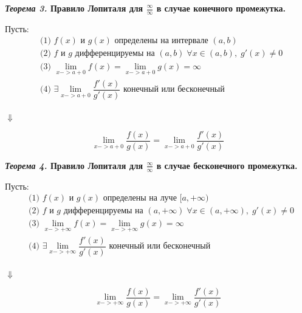 \documentclass[a4paper,12pt]{article}
\theoremstyle{plain} %
\theoremstyle{definition} %
\theoremstyle{remark} %
\begin{document}
\textbf{\textit{Теорема 3.} Правило Лопиталя для $\frac{\infty}{\infty}$ в случае конечного промежутка.}

Пусть:
\begin{equation*}
	\begin{aligned}
		 & \text{(1) } f(x) \text{ и } g(x) \text{ определены на интервале }(a, b)                                 \\
		 & \text{(2) } f \text{ и } g \text{ дифференцируемы на } (a, b)  \; \forall x \in (a, b), \; g'(x) \neq 0 \\
		 & \text{(3) }  \lim_{x-> a + 0} f(x) =  \lim_{x-> a + 0} g(x) = \infty                                    \\
		 & \text{(4) }  \exists \lim_{x-> a + 0 } \dfrac{f'(x)}{g'(x)} \text{ конечный или бесконечный }           \\
	\end{aligned}
\end{equation*}

\begin{center}
	$\Downarrow$
\end{center}

\[\lim_{x-> a + 0} \dfrac{f(x)}{g(x)} =\lim_{x-> a + 0 } \dfrac{f'(x)}{g'(x)} \]



\textbf{\textit{Теорема 4.} Правило Лопиталя для $\frac{\infty}{\infty}$ в случае бесконечного промежутка.}

Пусть:
\begin{equation*}
	\begin{aligned}
		 & \text{(1) } f(x) \text{ и } g(x) \text{ определены на луче }[a, +\infty)                                            \\
		 & \text{(2) } f \text{ и } g \text{ дифференцируемы на } (a, +\infty)  \; \forall x \in (a, +\infty), \; g'(x) \neq 0 \\
		 & \text{(3) }  \lim_{x-> + \infty} f(x) =  \lim_{x-> +\infty} g(x) = \infty                                           \\
		 & \text{(4) }  \exists \lim_{x-> +\infty } \dfrac{f'(x)}{g'(x)} \text{ конечный или бесконечный }                     \\
	\end{aligned}
\end{equation*}

\begin{center}
	$\Downarrow$
\end{center}

\[\lim_{x-> + \infty} \dfrac{f(x)}{g(x)} =\lim_{x-> + \infty } \dfrac{f'(x)}{g'(x)} \]
\end{document}
